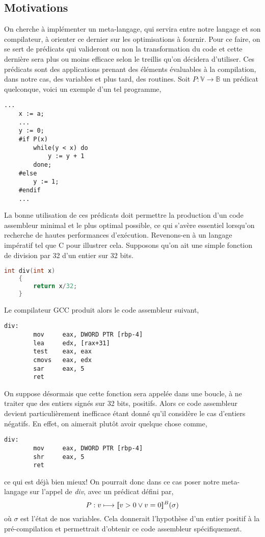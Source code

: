 \documentclass[a4paper, 10pt]{article}
\begin{document}
\subsection{Motivations}
On cherche à implémenter un meta-langage, qui servira entre notre langage et son compilateur, à orienter
ce dernier sur les optimisations à fournir. Pour ce faire, on se sert de prédicats qui valideront ou non la
transformation du code et cette dernière sera plus ou moins efficace selon le treillis qu'on décidera d'utiliser. 
Ces prédicats sont des applications prenant des éléments évaluables à la compilation, 
dans notre cas, des variables et plus tard, des routines.
Soit $P : \mathbb{V} \longrightarrow \mathbb{B}$ un prédicat quelconque, voici un exemple d'un tel programme,
\begin{lstlisting}[tabsize=2]
	...
	x := a;
	...
	y := 0;
	#if P(x)
		while(y < x) do
			y := y + 1
		done;
	#else
		y := 1;
	#endif
	...
\end{lstlisting}
La bonne utilisation de ces prédicats doit permettre la production d'un code assembleur minimal et le plus
optimal possible, ce qui s'avère essentiel lorsqu'on recherche de hautes performances d'exécution.
Revenons-en à un langage impératif tel que C pour illustrer cela. Supposons qu'on ait une simple fonction de division 
par 32 d'un entier sur 32 bits.
\begin{lstlisting}[tabsize=2, language=c]
	int div(int x)
	{
		return x/32;
	}
\end{lstlisting}
Le compilateur GCC produit alors le code assembleur suivant,
\begin{lstlisting}[tabsize=2]
	div:
		mov     eax, DWORD PTR [rbp-4]
		lea     edx, [rax+31]
		test    eax, eax
		cmovs   eax, edx
		sar     eax, 5
		ret
\end{lstlisting}
On suppose désormais que cette fonction sera appelée dans une boucle, à ne traiter que des entiers signés sur 32 bits, positifs.
Alors ce code assembleur devient particulièrement inefficace étant donné qu'il considère le cas d'entiers
négatifs. En effet, on aimerait plutôt avoir quelque chose comme,
\begin{lstlisting}[tabsize=2]
	div:
		mov     eax, DWORD PTR [rbp-4]
		shr     eax, 5
		ret
\end{lstlisting}
ce qui est déjà bien mieux! On pourrait donc dans ce cas poser notre meta-langage sur l'appel de \textit{div}, avec un prédicat
défini par,
\[P : v \longmapsto [\![{v > 0 \vee v = 0}]\!]^{B}(\sigma)\]
où $\sigma$ est l'état de nos variables. Cela donnerait l'hypothèse d'un entier positif à la pré-compilation
et permettrait d'obtenir ce code assembleur spécifiquement.
\end{document}
